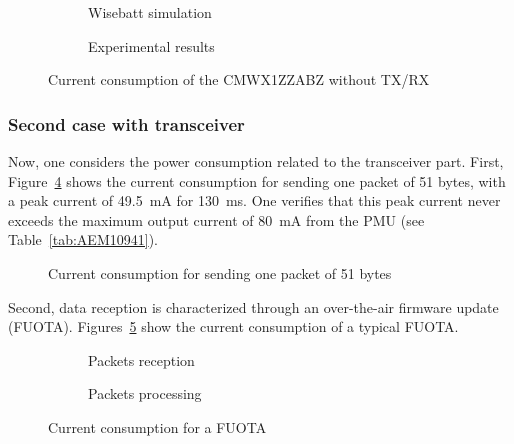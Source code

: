\documentclass{EPL-master-thesis-covers-EN}
\begin{document}
\begin{figure}[H]
\begin{subfigure}{.49\textwidth}
  \centering
    
    \caption{Wisebatt simulation}
    \label{fig:wisebatt1}
\end{subfigure}
\begin{subfigure}{.49\textwidth}
  \centering
  
  \caption{Experimental results}
  \label{fig:consumption_fft}
\end{subfigure}
\caption{Current consumption of the CMWX1ZZABZ without TX/RX}
\end{figure}


\subsubsection*{Second case with transceiver}

Now, one considers the power consumption related to the transceiver part. First, Figure~\ref{fig:current_consumption_MCU_RF_lorawan_TX} shows the current consumption for sending one packet of 51 bytes, with a peak current of \SI{49.5}{mA} for \SI{130}{ms}. One verifies that this peak current never exceeds the maximum output current of \SI{80}{mA} from the PMU (see Table~\ref{tab:AEM10941}).

\begin{figure}[H]
    \centering
    
    \caption{Current consumption for sending one packet of 51 bytes}
    \label{fig:current_consumption_MCU_RF_lorawan_TX}
\end{figure}

Second, data reception is characterized through an over-the-air firmware update (FUOTA). Figures~\ref{fig:current_consumption_MCU_RF_FUOTA} show the current consumption of a typical FUOTA.

\begin{figure}[H]
\begin{subfigure}{.49\textwidth}
  \centering
  
  \caption{Packets reception}
\end{subfigure}
\begin{subfigure}{.49\textwidth}
  \centering
   
  \caption{Packets processing}
\end{subfigure}
\caption{Current consumption for a FUOTA}
\label{fig:current_consumption_MCU_RF_FUOTA}
\end{figure}
\end{document}
